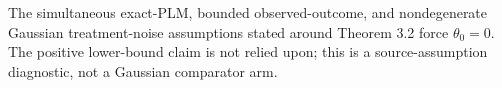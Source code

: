 The simultaneous exact-PLM, bounded observed-outcome, and nondegenerate Gaussian treatment-noise assumptions stated around Theorem 3.2 force \(\theta_0=0\). The positive lower-bound claim is not relied upon; this is a source-assumption diagnostic, not a Gaussian comparator arm.